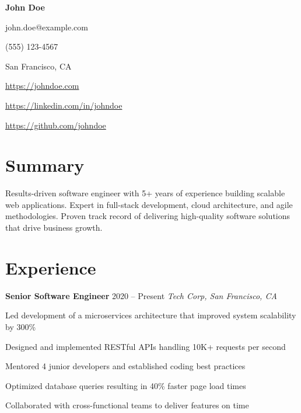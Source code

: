 \documentclass[10pt]{article}
\begin{document}
\begin{center}
    \textbf{\LARGE \textcolor{primary}{John Doe}} \\[0.2cm]
    \begin{minipage}{0.8\linewidth}
    \centering
    \begin{itemize*}
      \item john.doe@example.com
      \item (555) 123-4567
      \item San Francisco, CA
      \item \url{https://johndoe.com}
      \item \url{https://linkedin.com/in/johndoe}
      \item \url{https://github.com/johndoe}
    \end{itemize*}
    \end{minipage}
\end{center}

\section*{Summary}
Results-driven software engineer with 5+ years of experience building scalable web applications. Expert in full-stack development, cloud architecture, and agile methodologies. Proven track record of delivering high-quality software solutions that drive business growth.

\section*{Experience}

\textbf{Senior Software Engineer} \hfill 2020 -- Present
\textit{Tech Corp, San Francisco, CA}

\begin{itemize*}
  \item Led development of a microservices architecture that improved system scalability by 300\%
  \item Designed and implemented RESTful APIs handling 10K+ requests per second
  \item Mentored 4 junior developers and established coding best practices
  \item Optimized database queries resulting in 40\% faster page load times
  \item Collaborated with cross-functional teams to deliver features on time
\end{itemize*}
\end{document}
